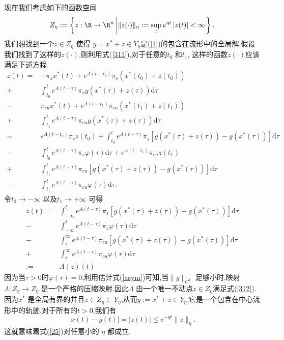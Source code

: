 现在我们考虑如下的函数空间
\begin{equation}
Z_\eta := \left\{ z:\R\to \R^{n}\left| \|z(\cdot )\|_{\eta}:=\sup_{t}e^{\eta t}\left| z(t) \right| <\infty  \right. \right\} .
\end{equation}
我们想找到一个$z\in Z_\eta$ 使得 $y=x^{\ast}+z\in Y_\eta$是(\ref{1})的包含在流形中的全局解.假设我们找到了这样的$z(\cdot )$,则利用式(\ref{311}),对于任意的$t_0$ 和$t_1$, 这样的函数$z(\cdot )$应该满足下述方程
\begin{align*}
  z(t)=& -\pi_s x^{\ast}(t)+e^{A(t-t_0)}\pi_s(x^{\ast}(t_0)+z(t_0))\\
  +& \int_{t_0}^{t}e^{A(t-\tau)}\pi_sg\left(x^{\ast}(\tau)+z(\tau)\right)\mathrm{d}\tau\\
  -& \pi_{cu}x^{\ast}(t)+e^{A(t-t_1)}\pi_{cu}\left( x^{\ast}(t_1)+z(t_1) \right)\\
  + & \int_{t_1}^{t}e^{A(t-\tau)}\pi_{cu}g\left( x^{\ast}(\tau)+z(\tau) \right) \mathrm{d}\tau\\
  =& e^{A(t-t_0)}\pi_sz(t_0)+\int_{t_0}^{t}e^{A(t-\tau)}\pi_s\left[ g\left( x^{\ast}(\tau)+z(\tau) \right) -g\left( x^{\ast}(\tau) \right)  \right] \mathrm{d}\tau\\
  -& \int_{t_0}^{t}e^{A(t-\tau)}\pi_s\varphi(\tau)\mathrm{d}\tau+e^{A(t-t_1)}\pi_{cu}z(t_1)\\
  + & \int_{t_1}^{t}e^{A(t-\tau)}\pi_{cu}\left[ g\left( x^{\ast}(\tau)+z(\tau) \right) -g\left( x^{\ast}(\tau) \right)  \right] \mathrm{d}\tau\\
  -& \int_{t_1}^{t}e^{A(t-\tau)}\pi_{cu}\varphi(\tau)\mathrm{d}\tau
.\end{align*}
令$t_0\to-\infty$ 以及$t_1\to +\infty$ 可得
\begin{equation}
  \begin{aligned}
    z(t)=& \int_{-\infty}^{t}e^{A(t-\tau)}\pi_s\left[ g\left( x^{\ast}(\tau)+z(\tau) \right) -g\left( x^{\ast}(\tau) \right)  \right] \mathrm{d}\tau\\
    -& \int_{-\infty}^{t}e^{A(t-\tau)}\pi_s\varphi(\tau)\mathrm{d}\tau\\
    -& \int_{t}^{\infty}e^{A(t-\tau)}\pi_{cu}\left[ g\left( x^{\ast}(\tau)+z(\tau) \right) -g\left( x^{\ast}(\tau) \right)  \right] \mathrm{d}\tau\\
    +& \int_{t}^{\infty}e^{A(t-\tau)}\pi_{cu}\varphi(\tau)\mathrm{d}\tau\\
    :=&\Lambda(z)(t)
  \end{aligned}\label{312}
\end{equation}
因为当$\tau>0$时$\varphi(\tau)=0$,利用估计式(\ref{asym})可知,当$\|g\|_{C^{1}}$ 足够小时,映射$\Lambda:Z_{\eta}\to Z_{\eta}$ 是一个严格的压缩映射.因此$\Lambda$ 由一个唯一不动点$z\in Z_\eta$满足式(\ref{312}).因为$x^{\ast}$ 是全局有界的并且$z\in Z_\eta\subset Y_{\eta}$,从而$y:=x^{\ast}+z\in Y_{\eta}$,它是一个包含在中心流形中的轨迹.对于所有的$t>0$,我们有
 \[
   \left| x(t)-y(t) \right| =\left| z(t) \right| \le e^{-\eta t}\|z\|_{\eta}.
\]
这就意味着式(\ref{25})对任意小的 $\eta$ 都成立.

